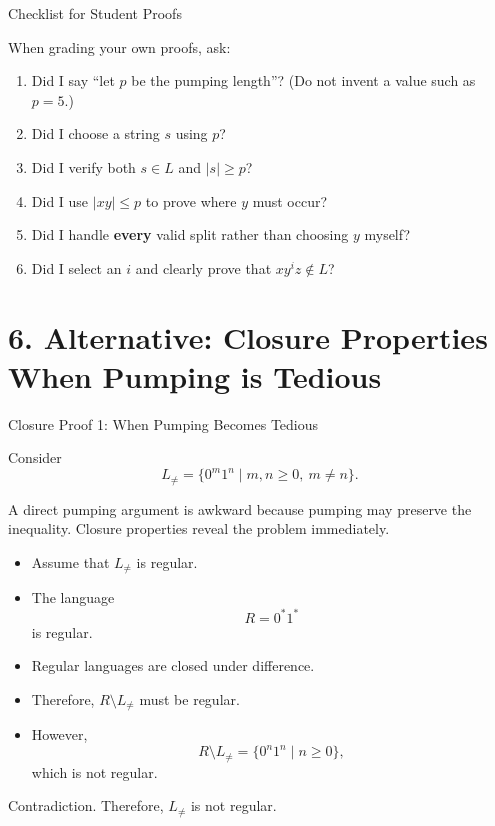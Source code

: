 \documentclass[10pt,aspectratio=169]{beamer}
\begin{document}
\begin{frame}{Checklist for Student Proofs}

When grading your own proofs, ask:

\vspace{0.6em}
\begin{enumerate}
    \item Did I say ``let $p$ be the pumping length''? (Do not invent a value such as $p=5$.)
    \item Did I choose a string $s$ using $p$?
    \item Did I verify both $s\in L$ and $|s|\geq p$?
    \item Did I use $|xy|\leq p$ to prove where $y$ must occur?
    \item Did I handle \textbf{every} valid split rather than choosing $y$ myself?
    \item Did I select an $i$ and clearly prove that $xy^iz\notin L$?
\end{enumerate}

\end{frame}

\section{6. Alternative: Closure Properties\\When Pumping is Tedious}


\begin{frame}{Closure Proof 1: When Pumping Becomes Tedious}

\small
Consider
\[
L_{\neq}
=
\{0^m1^n\mid m,n\geq 0,\ m\neq n\}.
\]

A direct pumping argument is awkward because pumping may preserve the
inequality. Closure properties reveal the problem immediately.

\vspace{0.5em}
\begin{itemize}
    \item Assume that $L_{\neq}$ is regular.
    \item The language
    \[
    R=0^*1^*
    \]
    is regular.
    \item Regular languages are closed under difference.
    \item Therefore, $R\setminus L_{\neq}$ must be regular.
    \item However,
    \[
    R\setminus L_{\neq}
    =
    \{0^n1^n\mid n\geq 0\},
    \]
    which is not regular.
\end{itemize}

\alert{Contradiction. Therefore, $L_{\neq}$ is not regular.}

\end{frame}
\end{document}

